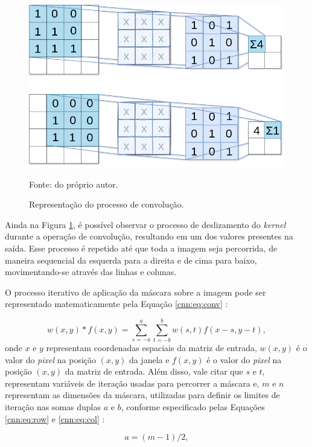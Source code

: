 \begin{figure}[H]
    \centering
    \caption{Representação do processo de convolução.}
    \includegraphics[width=1\linewidth]{recursos/imagens/deep/2d_convolution.png}
    \label{cnn:fig:6}

    Fonte: do próprio autor.
\end{figure}

Ainda na Figura \ref{cnn:fig:6}, é possível observar o processo de deslizamento do \textit{kernel} durante a operação de convolução, resultando em um dos valores presentes na saída. Esse processo é repetido até que toda a imagem seja percorrida, de maneira sequencial da esquerda para a direita e de cima para baixo, movimentando-se através das linhas e colunas.

O processo iterativo de aplicação da máscara sobre a imagem pode ser representado matematicamente pela Equação \ref{cnn:eq:conv} \citep{Gonzalez2009}:

\begin{equation}
    \label{cnn:eq:conv}
    w(x,y)*f(x,y) = \sum\limits_{s=-a}^a \sum\limits_{t=-b}^b w(s,t)f(x-s,y-t),
\end{equation}
onde $x$ e $y$ representam coordenadas espaciais da matriz de entrada, $w(x,y)$ é o valor do \textit{pixel} na posição $(x,y)$ da janela e $f(x,y)$ é o valor do \textit{pixel} na posição $(x,y)$ da matriz de entrada. Além disso, vale citar que $s$ e $t$, representam variáveis de iteração usadas para percorrer a máscara e, $m$ e $n$ representam as dimensões da máscara, utilizadas para definir os limites de iteração nas somas duplas $a$ e $b$, conforme especificado pelas Equações \ref{cnn:eq:row} e \ref{cnn:eq:col} \citep{Gonzalez2009}:

\begin{equation} 
   \label{cnn:eq:row}
   a = (m-1)/2,
\end{equation}

